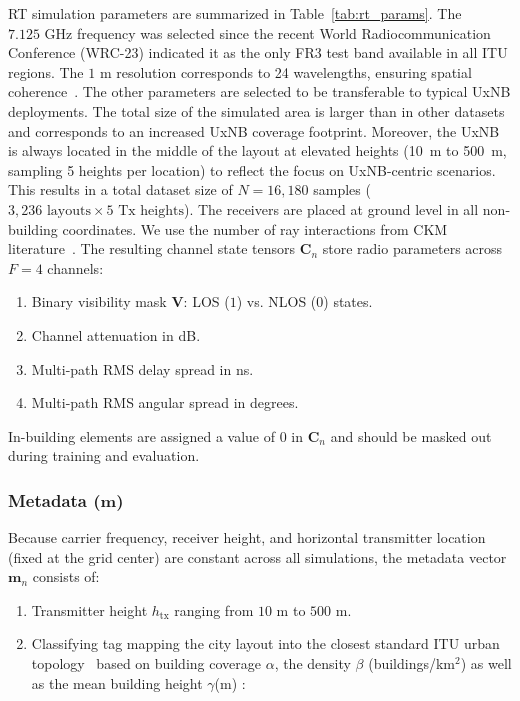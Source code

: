 \documentclass[10pt,conference,letterpaper]{IEEEtran}
\begin{document}
RT simulation parameters are summarized in Table~\ref{tab:rt_params}. The $7.125\text{~GHz}$ frequency was selected since the recent World Radiocommunication Conference (WRC-23) indicated it as the only FR3 test band available in all ITU regions. The $1\text{~m}$ resolution corresponds to 24 wavelengths, ensuring spatial coherence~\cite{saboor26}. The other parameters are selected to be transferable to typical UxNB deployments. The total size of the simulated area is larger than in other datasets~\cite{dataset2212,ckmimagenet2025} and corresponds to an increased UxNB coverage footprint. Moreover, the UxNB is always located in the middle of the layout at elevated heights (10~m to 500~m, sampling 5 heights per location) to reflect the focus on UxNB-centric scenarios. This results in a total dataset size of $N = 16,180$ samples ($3,236 \text{ layouts} \times 5 \text{ Tx heights}$). The receivers are placed at ground level in all non-building coordinates. We use the number of ray interactions from CKM literature~\cite{dataset2212}. The resulting channel state tensors $\mathbf{C}_n$ store radio parameters across $F=4$ channels:
\begin{enumerate}
    \item Binary visibility mask $\mathbf{V}$: LOS ($1$) vs. NLOS ($0$) states.
    \item Channel attenuation in dB.
    \item Multi-path RMS delay spread in ns.
    \item  Multi-path RMS angular spread in degrees.
\end{enumerate}
In-building elements are assigned a value of $0$ in $\mathbf{C}_n$ and should be masked out during training and evaluation.

\subsubsection{Metadata ($\mathbf{m}$)}
\label{sec:metadata}

Because carrier frequency, receiver height, and horizontal transmitter location (fixed at the grid center) are constant across all simulations, the metadata vector $\mathbf{m}_n$ consists of:
\begin{enumerate}
    \item Transmitter height $h_{\text{tx}}$ ranging from $10\text{~m}$ to $500\text{~m}$.
    \item Classifying tag mapping the city layout into the closest standard ITU urban topology~\cite{iturp1410} based on building coverage $\alpha$, the density $\beta$ (buildings/km$^2$) as well as the mean building height $\gamma${(m)} :
\end{enumerate}
\end{document}
